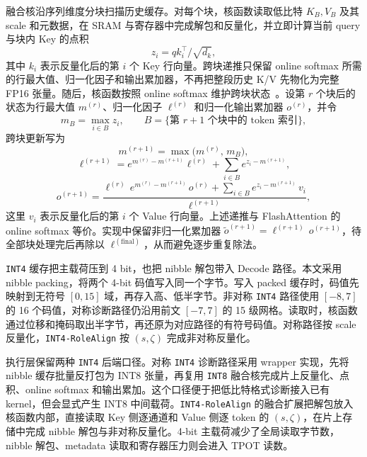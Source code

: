 融合核沿序列维度分块扫描历史缓存。对每个块，核函数读取低比特 $K_B,V_B$ 及其 scale 和元数据，在 SRAM 与寄存器中完成解包和反量化，并立即计算当前 query 与块内 Key 的点积
\[
z_i = q k_i^\top / \sqrt{d_k},
\]
其中 $k_i$ 表示反量化后的第 $i$ 个 Key 行向量。跨块递推只保留 online softmax 所需的行最大值、归一化因子和输出累加器，不再把整段历史 K/V 先物化为完整 FP16 张量。随后，核函数按照 online softmax 维护跨块状态~\cite{dao2022flashattention}。设第 $r$ 个块后的状态为行最大值 $m^{(r)}$、归一化因子 $\ell^{(r)}$ 和归一化输出累加器 $o^{(r)}$，并令
\begin{equation}
m_B = \max_{i\in B} z_i,
\qquad
B = \{\text{第 } r{+}1 \text{ 个块中的 token 索引}\},
\end{equation}
跨块更新写为
\begin{equation}
m^{(r+1)}
=
\max\!\bigl(m^{(r)},\, m_B\bigr),
\end{equation}
\begin{equation}
\ell^{(r+1)}
=
e^{m^{(r)}-m^{(r+1)}}\ell^{(r)}
+
\sum_{i\in B} e^{z_i-m^{(r+1)}},
\end{equation}
\begin{equation}
o^{(r+1)}
=
\frac{
\ell^{(r)}\,e^{m^{(r)}-m^{(r+1)}}\,o^{(r)}
+
\sum_{i\in B} e^{z_i-m^{(r+1)}}\, v_i
}{
\ell^{(r+1)}
},
\end{equation}
这里 $v_i$ 表示反量化后的第 $i$ 个 Value 行向量。上述递推与 FlashAttention 的 online softmax 等价。实现中保留非归一化累加器 $\tilde o^{(r+1)} = \ell^{(r+1)}\,o^{(r+1)}$，待全部块处理完后再除以 $\ell^{(\mathrm{final})}$，从而避免逐步重复除法。

\texttt{INT4} 缓存把主载荷压到 4 bit，也把 nibble 解包带入 Decode 路径。本文采用 nibble packing，将两个 4-bit 码值写入同一个字节。写入 packed 缓存时，码值先映射到无符号 $[0,15]$ 域，再存入高、低半字节。非对称 \texttt{INT4} 路径使用 $[-8,7]$ 的 16 个码值，对称诊断路径仍沿用前文 $[-7,7]$ 的 15 级网格。读取时，核函数通过位移和掩码取出半字节，再还原为对应路径的有符号码值。对称路径按 scale 反量化，\texttt{INT4-RoleAlign} 按 $(s,\zeta)$ 完成非对称反量化。

执行层保留两种 \texttt{INT4} 后端口径。对称 \texttt{INT4} 诊断路径采用 wrapper 实现，先将 nibble 缓存批量反打包为 INT8 张量，再复用 \texttt{INT8} 融合核完成片上反量化、点积、online softmax 和输出累加。这个口径便于把低比特格式诊断接入已有 kernel，但会显式产生 INT8 中间载荷。\texttt{INT4-RoleAlign} 的融合扩展把解包放入核函数内部，直接读取 Key 侧逐通道和 Value 侧逐 token 的 $(s,\zeta)$，在片上存储中完成 nibble 解包与非对称反量化。4-bit 主载荷减少了全局读取字节数，nibble 解包、metadata 读取和寄存器压力则会进入 TPOT 读数。


